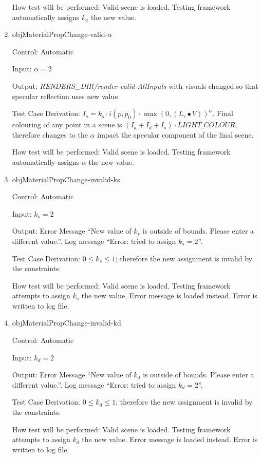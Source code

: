 \documentclass[12pt, titlepage]{article}
\begin{document}
\begin{enumerate}
	How test will be performed: Valid scene is loaded. Testing framework 
	automatically assigns $k_{a}$ the new value. 

	\item{objMaterialPropChange-valid-$\alpha$\\}
	
	Control: Automatic
	
	Input: $\alpha = 2$
	
	Output: \textit{RENDERS\_DIR/render-valid-AllInputs} with visuals changed 
	so that specular reflection uses new value.
	
	Test Case Derivation: $I_{s} = k_{s}\cdot i(p,p_{0}) \cdot \max(0, 
	({L_{r}}\bullet V))^\alpha$. Final colouring of any point in a scene is 
	$(I_{a}+I_{d}+I_{s})\cdot LIGHT\_COLOUR$, therefore changes to the $\alpha$ 
	impact the specular component of the final scene.
	
	How test will be performed: Valid scene is loaded. Testing framework 
	automatically assigns $\alpha$ the new value. 

	\item{objMaterialPropChange-invalid-ks\\}
	
	Control: Automatic
	
	Input: $k_{s} = 2$
	
	Output: Error Message ``New value of $k_{s}$ is outside of bounds. Please 
	enter a different value.''. Log message ``Error: tried to assign $k_{s} = 
	2$''. 
	
	Test Case Derivation: $0 \le k_{s} \le 1$; therefore the new assignment is 
	invalid by the constraints.
	
	How test will be performed: Valid scene is loaded. Testing framework 
	attempts to assign $k_{s}$ the new value. Error message is loaded instead. 
	Error is written to log file.
	
	\item{objMaterialPropChange-invalid-kd\\}
	
	Control: Automatic
	
	Input: $k_{d} = 2$
	
	Output: Error Message ``New value of $k_{d}$ is outside of bounds. Please 
	enter a different value.''. Log message ``Error: tried to assign $k_{d} = 
	2$''. 
	
	Test Case Derivation: $0 \le k_{d} \le 1$; therefore the new assignment is 
	invalid by the constraints.
	
	How test will be performed: Valid scene is loaded. Testing framework 
	attempts to assign $k_{d}$ the new value. Error message is loaded instead. 
	Error is written to log file.
	

\end{enumerate}
\end{document}
